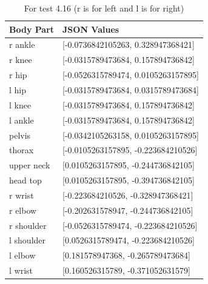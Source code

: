 \documentclass{scrreprt}
\begin{document}
\begin{table}[H]
    \centering
    \caption{For test 4.16 (r is for left and l is for right)}
    \begin{tabular}{||p{2cm}|p{6.5cm}||}
        \hline
        \textbf{Body Part} & \textbf {JSON Values}\\
         \hline\hline
        r ankle & [-0.0736842105263, 0.328947368421] \\
        \hline
        r knee & [-0.0315789473684, 0.157894736842] \\
        \hline
        r hip & [-0.0526315789474, 0.0105263157895] \\
        \hline
        l hip & [-0.0315789473684, 0.0315789473684] \\
        \hline
        l knee & [-0.0315789473684, 0.157894736842] \\
        \hline
        l ankle & [-0.0315789473684, 0.157894736842] \\
        \hline
        pelvis & [-0.0342105263158, 0.0105263157895]\\
        \hline
        thorax & [-0.0105263157895, -0.223684210526] \\
        \hline
        upper neck & [0.0105263157895, -0.244736842105] \\
        \hline
        head top & [0.0105263157895, -0.394736842105] \\
        \hline
        r wrist & [-0.223684210526, -0.328947368421] \\
        \hline
        r elbow & [-0.202631578947, -0.244736842105] \\
        \hline
        r shoulder & [-0.0526315789474, -0.223684210526] \\
        \hline
        l shoulder & [0.0526315789474, -0.223684210526] \\
        \hline
        l elbow & [0.181578947368, -0.265789473684] \\
        \hline
        l wrist & [0.160526315789, -0.371052631579] \\
        \hline
    \end{tabular}
\end{table}
\end{document}

